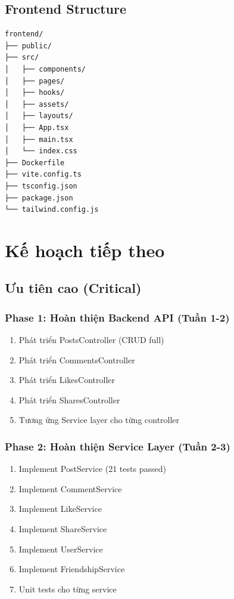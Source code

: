 \documentclass[12pt,a4paper]{report}
\begin{document}
\section{Frontend Structure}
\begin{verbatim}
frontend/
├── public/
├── src/
│   ├── components/
│   ├── pages/
│   ├── hooks/
│   ├── assets/
│   ├── layouts/
│   ├── App.tsx
│   ├── main.tsx
│   └── index.css
├── Dockerfile
├── vite.config.ts
├── tsconfig.json
├── package.json
└── tailwind.config.js
\end{verbatim}

\newpage

\chapter{Kế hoạch tiếp theo}

\section{Ưu tiên cao (Critical)}

\subsection{Phase 1: Hoàn thiện Backend API (Tuần 1-2)}
\begin{enumerate}
    \item Phát triển PostsController (CRUD full)
    \item Phát triển CommentsController
    \item Phát triển LikesController
    \item Phát triển SharesController
    \item Tương ứng Service layer cho từng controller
\end{enumerate}

\subsection{Phase 2: Hoàn thiện Service Layer (Tuần 2-3)}
\begin{enumerate}
    \item Implement PostService (21 tests passed)
    \item Implement CommentService
    \item Implement LikeService
    \item Implement ShareService
    \item Implement UserService
    \item Implement FriendshipService
    \item Unit tests cho từng service
\end{enumerate}
\end{document}
